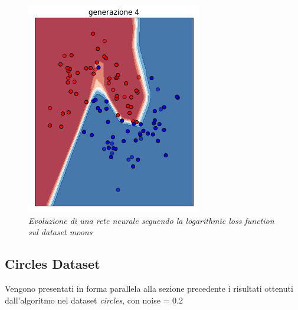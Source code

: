 \documentclass[12pt,a4paper]{report}
\begin{document}
\begin{figure}[H]
 \includegraphics[scale = 0.35]{images/moons-rnd-log./4}
 \caption{\textit{Evoluzione di una rete neurale seguendo la logarithmic loss function sul dataset moons}}
 \label{moons3}
\end{figure}

\subsection{Circles Dataset}

Vengono presentati in forma parallela alla sezione precedente i risultati ottenuti dall'algoritmo nel dataset \textit{circles}, con noise = 0.2
\end{document}
